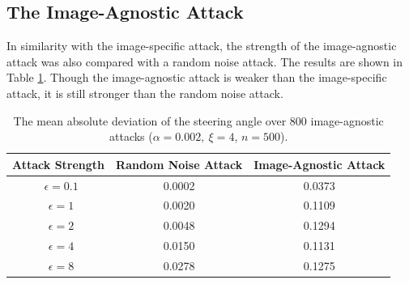 
\subsection{The Image-Agnostic Attack}

In similarity with the image-specific attack, the strength of the image-agnostic attack was also compared with a random noise attack.
The results are shown in Table \ref{tab:image-agnostic}. Though the image-agnostic attack is weaker than the image-specific attack, it is still stronger than the random noise attack.

\begin{table}[H]
    \centering
    \begin{tabular}{ccc}
    \hline
    Attack Strength & Random Noise Attack & Image-Agnostic Attack\\
    \hline
    \ $\epsilon=0.1$    & 0.0002    & 0.0373 \\
    \ $\epsilon=1$      & 0.0020    & 0.1109 \\
    \ $\epsilon=2$      & 0.0048    & 0.1294 \\
    \ $\epsilon=4$      & 0.0150    & 0.1131 \\
    \ $\epsilon=8$      & 0.0278    & 0.1275 \\
    \hline
    \end{tabular}
    \caption{The mean absolute deviation of the steering angle over 800 image-agnostic attacks ($\alpha=0.002,\ \xi=4$, $n=500$).}
    \label{tab:image-agnostic}
\end{table}





